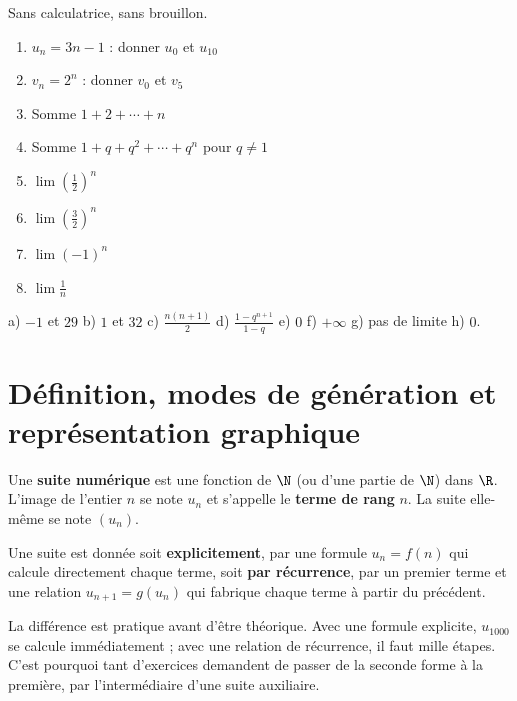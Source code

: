 \begin{automatismes}
Sans calculatrice, sans brouillon.

\begin{enumerate}[label=\textbf{\alph*)}, leftmargin=*, itemsep=0.25em]
  \item $u_{n} = 3n-1$ : donner $u_{0}$ et $u_{10}$
  \item $v_{n} = 2^{n}$ : donner $v_{0}$ et $v_{5}$
  \item Somme $1+2+\cdots+n$
  \item Somme $1+q+q^{2}+\cdots+q^{n}$ pour $q \neq 1$
  \item $\lim\left(\frac12\right)^{n}$
  \item $\lim\left(\frac32\right)^{n}$
  \item $\lim (-1)^{n}$
  \item $\lim \frac{1}{n}$
\end{enumerate}
\end{automatismes}

\begin{corrige}[automatismes]
a) $-1$ et $29$ \quad b) $1$ et $32$ \quad c) $\frac{n(n+1)}{2}$ \quad
d) $\frac{1-q^{n+1}}{1-q}$ \quad e) $0$ \quad f) $+\infty$ \quad
g) pas de limite \quad h) $0$.
\end{corrige}

\section{Définition, modes de génération et représentation graphique}

\begin{definition}
Une \textbf{suite numérique} est une fonction de $\N$ (ou d'une partie de
$\N$) dans $\R$. L'image de l'entier $n$ se note $u_{n}$ et s'appelle le
\textbf{terme de rang} $n$. La suite elle-même se note $(u_{n})$.
\end{definition}

\begin{propriete}
Une suite est donnée soit \textbf{explicitement}, par une formule
$u_{n} = f(n)$ qui calcule directement chaque terme, soit \textbf{par
récurrence}, par un premier terme et une relation $u_{n+1} = g(u_{n})$ qui
fabrique chaque terme à partir du précédent.
\end{propriete}

\begin{remarque}
La différence est pratique avant d'être théorique. Avec une formule
explicite, $u_{1000}$ se calcule immédiatement ; avec une relation de
récurrence, il faut mille étapes. C'est pourquoi tant d'exercices demandent de
passer de la seconde forme à la première, par l'intermédiaire d'une suite
auxiliaire.
\end{remarque}

